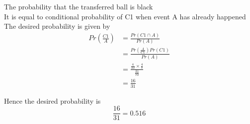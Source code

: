 \documentclass[journel,12pt,twocoloums]{IEEEtran}
\begin{document}
The probability that the transferred ball is black\\
It is equal to conditional probability of C1 when event A has already happened\\
The desired probability is given by\\
\begin{align*}
Pr(\frac{C1}{A})&=\frac{Pr(C1 \cap A)}{Pr(A)}\\
        &=\frac{Pr(\frac{A}{C1})Pr(C1)}{Pr(A)}\\
        &=\frac{\frac{4}{10} \times \frac{4}{7}}{\frac{31}{70}}\\
        &=\frac{16}{31}
\end{align*}

Hence the desired probability is $$\frac{16}{31}=0.516$$
            
\end{document}
